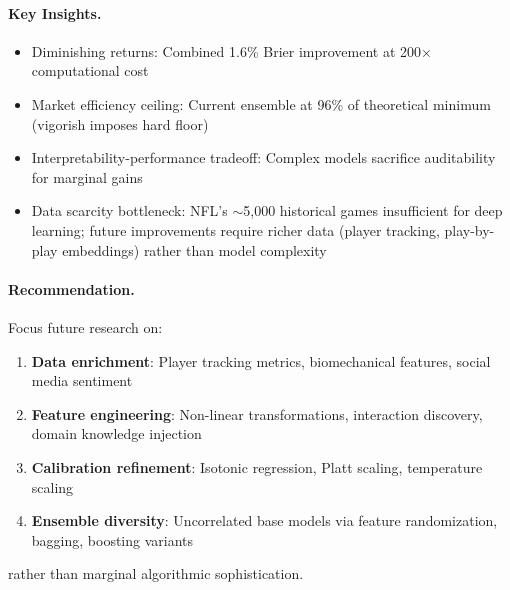 \paragraph{Key Insights.}
\begin{itemize}
  \item Diminishing returns: Combined 1.6\% Brier improvement at 200× computational cost
  \item Market efficiency ceiling: Current ensemble at 96\% of theoretical minimum (vigorish imposes hard floor)
  \item Interpretability-performance tradeoff: Complex models sacrifice auditability for marginal gains
  \item Data scarcity bottleneck: NFL's $\sim$5,000 historical games insufficient for deep learning; future improvements require richer data (player tracking, play-by-play embeddings) rather than model complexity
\end{itemize}

\paragraph{Recommendation.}
Focus future research on:
\begin{enumerate}
  \item \textbf{Data enrichment}: Player tracking metrics, biomechanical features, social media sentiment
  \item \textbf{Feature engineering}: Non-linear transformations, interaction discovery, domain knowledge injection
  \item \textbf{Calibration refinement}: Isotonic regression, Platt scaling, temperature scaling
  \item \textbf{Ensemble diversity}: Uncorrelated base models via feature randomization, bagging, boosting variants
\end{enumerate}

rather than marginal algorithmic sophistication.
